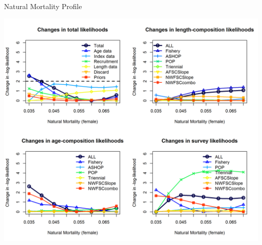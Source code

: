 \documentclass[pdf]{beamer}\usepackage[]{graphicx}\usepackage[]{color}
\begin{document}
\begin{frame}{Natural Mortality Profile}
  \begin{center}
    \includegraphics[scale = 0.40]{figures/piner_panel_m.png}
  \end{center}
\end{frame}
\end{document}

